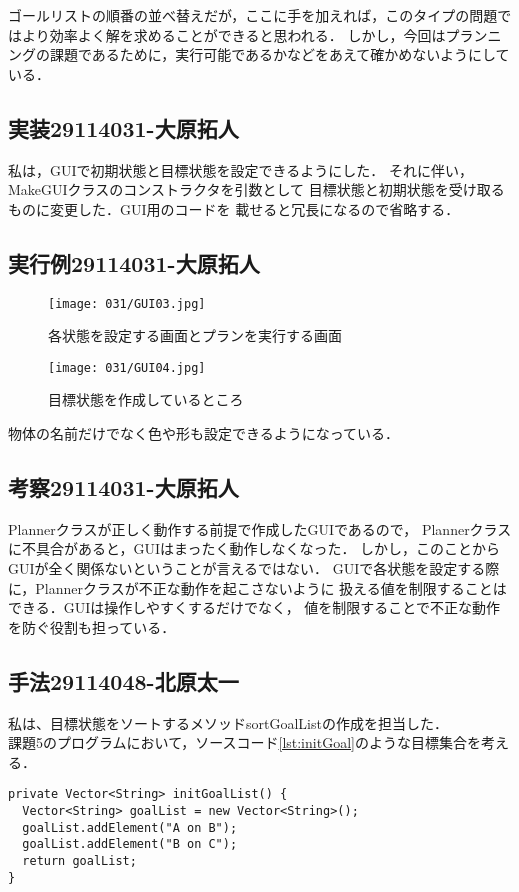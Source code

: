 \documentclass{jarticle}
\begin{document}
ゴールリストの順番の並べ替えだが，ここに手を加えれば，このタイプの問題ではより効率よく解を求めることができると思われる．
しかし，今回はプランニングの課題であるために，実行可能であるかなどをあえて確かめないようにしている．

\subsection{実装29114031-大原拓人}
私は，GUIで初期状態と目標状態を設定できるようにした．
それに伴い，MakeGUIクラスのコンストラクタを引数として
目標状態と初期状態を受け取るものに変更した．GUI用のコードを
載せると冗長になるので省略する．

\subsection{実行例29114031-大原拓人}
\begin{figure}[!hbt]
    \centering
    \texttt{[image: 031/GUI03.jpg]}
    \caption{各状態を設定する画面とプランを実行する画面}
    \label{fig:gui01}
\end{figure}
\begin{figure}[!hbt]
    \centering
    \texttt{[image: 031/GUI04.jpg]}
    \caption{目標状態を作成しているところ}
    \label{fig:gui01}
\end{figure}
物体の名前だけでなく色や形も設定できるようになっている．

\subsection{考察29114031-大原拓人}
Plannerクラスが正しく動作する前提で作成したGUIであるので，
Plannerクラスに不具合があると，GUIはまったく動作しなくなった．
しかし，このことからGUIが全く関係ないということが言えるではない．
GUIで各状態を設定する際に，Plannerクラスが不正な動作を起こさないように
扱える値を制限することはできる．GUIは操作しやすくするだけでなく，
値を制限することで不正な動作を防ぐ役割も担っている．

\subsection{手法29114048-北原太一}
私は、目標状態をソートするメソッドsortGoalListの作成を担当した．\\
課題5のプログラムにおいて，ソースコード\ref{lst:initGoal}のような目標集合を考える．
\begin{lstlisting}[caption=Planner.java(一部抜粋),label=lst:initGoal]
private Vector<String> initGoalList() {
  Vector<String> goalList = new Vector<String>();
  goalList.addElement("A on B");
  goalList.addElement("B on C");
  return goalList;
}
  \end{lstlisting}
 
\end{document}
